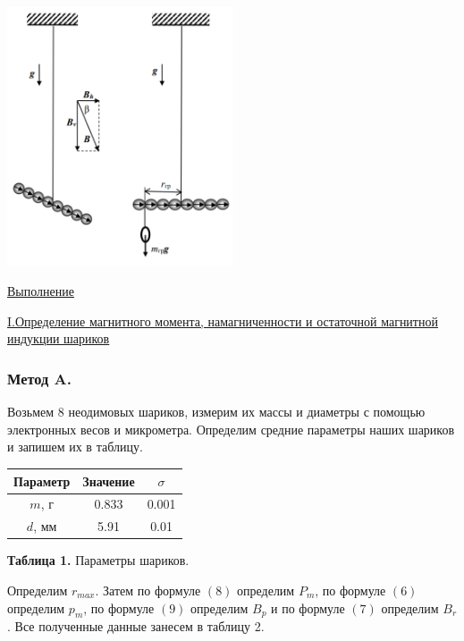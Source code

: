 \documentclass{article}
\begin{document}
\begin{center}
    \includegraphics[width=0.5\textwidth]{Bver.png}
\end{center}

\begin{center}
    \raggedleft
        \underline{\underline{\LARGE {Выполнение}}}
\end{center}

\begin{center}
    \underline{\large {\RN{1}.Определение магнитного момента, намагниченности и остаточной магнитной индукции шариков}}
\end{center}

\subsubsection*{Метод A. }

Возьмем 8 неодимовых шариков, измерим их массы и диаметры с помощью электронных весов и микрометра. 
Определим средние параметры наших шариков и запишем их в таблицу.

\begin{center}
    \begin{tabular}{|c|c|c|}
        \hline
        Параметр & Значение & $\sigma$ \\
        \hline
        $m$, г & 0.833 & 0.001 \\
        \hline
        $d$, мм & 5.91 & 0.01 \\
        \hline
    \end{tabular}
    
    \textbf{Таблица 1.} Параметры шариков.
\end{center}

Определим $r_{max}$. Затем по формуле $(8)$ определим $P_m$, по формуле $(6)$ определим $p_m$, по формуле $(9)$ определим $B_p$ и по формуле $(7)$ определим $B_r$. Все полученные данные занесем в таблицу 2.
\end{document}
